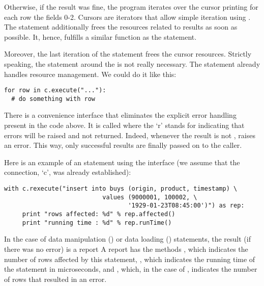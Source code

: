 Otherwise, if the result was fine,
the program iterates over the cursor
printing for each row the fields 0-2.
Cursors are iterators
that allow simple iteration using .
The  statement additionally frees
the resources related to  results
as soon as possible. It, hence, fulfills
a similar function as the  statement.

Moreover, the last iteration
of the  statement
frees the cursor resources.
Strictly speaking, the  statement
around the  is not really necessary.
The  statement already handles
resource management. We could do it like this:

\begin{python}
\begin{lstlisting}
for row in c.execute("..."):
  # do something with row
\end{lstlisting}
\end{python}

There is a convenience interface that
eliminates the explicit error handling
present in the code above.
It is called 
where the `r' stands for 
indicating that errors will be raised
and not returned.
Indeed, whenever the result is not ,
 raises an error.
This way, only successful results are finally
passed on to the caller.

\begin{minipage}{\textwidth}
Here is an example of an  statement
using the  interface
(we assume that the connection, `c', was already established):

\begin{python}
\begin{lstlisting}
with c.rexecute("insert into buys (origin, product, timestamp) \
                           values (9000001, 100002, \
                                  '1929-01-23T08:45:00')") as rep:
     print "rows affected: %d" % rep.affected()
     print "running time : %d" % rep.runTime()
\end{lstlisting}
\end{python}
\end{minipage}

In the case of data manipulation ()
or data loading () statements,
the result (if there was no error) is a report
A report has the methods \term{affected()},
which indicates the number of rows affected by this statement,
\term{runTime()},
which indicates the running time of the statement in microseconds,
and ,
which, in the case of \term{load},
indicates the number of rows that resulted in an error.


